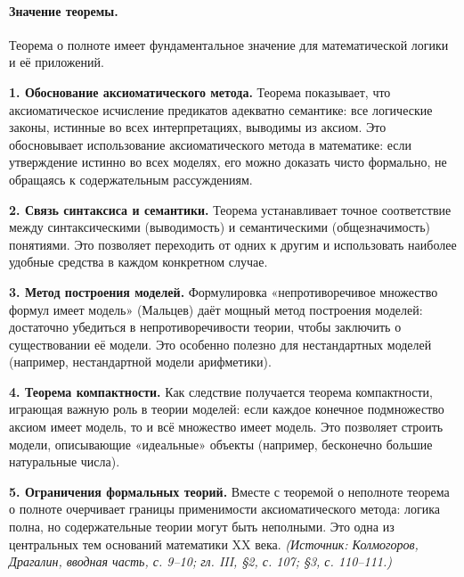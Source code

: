 \documentclass[a4paper,12pt]{article}
\begin{document}
\paragraph{Значение теоремы.} Теорема о полноте имеет фундаментальное значение для математической логики и её приложений.

\textbf{1. Обоснование аксиоматического метода.} Теорема показывает, что аксиоматическое исчисление предикатов адекватно семантике: все логические законы, истинные во всех интерпретациях, выводимы из аксиом. Это обосновывает использование аксиоматического метода в математике: если утверждение истинно во всех моделях, его можно доказать чисто формально, не обращаясь к содержательным рассуждениям.

\textbf{2. Связь синтаксиса и семантики.} Теорема устанавливает точное соответствие между синтаксическими (выводимость) и семантическими (общезначимость) понятиями. Это позволяет переходить от одних к другим и использовать наиболее удобные средства в каждом конкретном случае.

\textbf{3. Метод построения моделей.} Формулировка «непротиворечивое множество формул имеет модель» (Мальцев) даёт мощный метод построения моделей: достаточно убедиться в непротиворечивости теории, чтобы заключить о существовании её модели. Это особенно полезно для нестандартных моделей (например, нестандартной модели арифметики).

\textbf{4. Теорема компактности.} Как следствие получается теорема компактности, играющая важную роль в теории моделей: если каждое конечное подмножество аксиом имеет модель, то и всё множество имеет модель. Это позволяет строить модели, описывающие «идеальные» объекты (например, бесконечно большие натуральные числа).

\textbf{5. Ограничения формальных теорий.} Вместе с теоремой о неполноте теорема о полноте очерчивает границы применимости аксиоматического метода: логика полна, но содержательные теории могут быть неполными. Это одна из центральных тем оснований математики XX века.
\textit{(Источник: Колмогоров, Драгалин, вводная часть, с. 9--10; гл. III, §2, с. 107; §3, с. 110--111.)}
\end{document}
